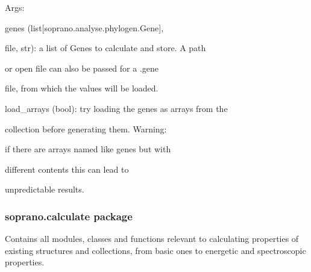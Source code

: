 \documentclass[letterpaper,10pt,english]{sphinxmanual}
\begin{document}
\begin{fulllineitems}
\begin{fulllineitems}
\begin{DUlineblock}{0em}
\item[] Args:
\item[]
\begin{DUlineblock}{\DUlineblockindent}
\item[] genes (list{[}soprano.analyse.phylogen.Gene{]},
\item[]
\begin{DUlineblock}{\DUlineblockindent}
\item[] file, str): a list of Genes to calculate and store. A path
\item[]
\begin{DUlineblock}{\DUlineblockindent}
\item[] or open file can also be passed for a .gene
\item[] file, from which the values will be loaded.
\end{DUlineblock}
\end{DUlineblock}
\item[] load\_arrays (bool): try loading the genes as arrays from the
\item[]
\begin{DUlineblock}{\DUlineblockindent}
\item[] collection before generating them. Warning:
\item[] if there are arrays named like genes but with
\item[] different contents this can lead to
\item[] unpredictable results.
\end{DUlineblock}
\end{DUlineblock}
\end{DUlineblock}

\end{fulllineitems}


\end{fulllineitems}



\subsubsection{soprano.calculate package}
\label{doctree/soprano.calculate:module-soprano.calculate}\label{doctree/soprano.calculate::doc}\label{doctree/soprano.calculate:soprano-calculate-package}
Contains all modules, classes and functions relevant
to calculating properties of existing structures and collections,
from basic ones to energetic and spectroscopic properties.
\end{document}
